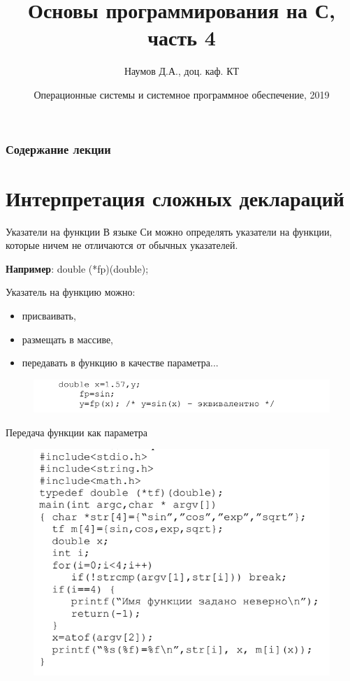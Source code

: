 \documentclass{beamer}
\title[Язык C]{Основы программирования на С, часть 4}
\author{Наумов Д.А., доц. каф. КТ}
\date[12.09.2019] {Операционные системы и системное программное обеспечение, 2019}
\begin{document}
\begin{frame}
  \titlepage
\end{frame}
  
\begin{frame}
  \frametitle{Содержание лекции}
  \tableofcontents  
\end{frame}

\section{Интерпретация сложных деклараций}
\begin{frame}{Указатели на функции}
В языке Си можно определять указатели на функции, которые
ничем не отличаются от обычных указателей. 

\textbf{Например}: double (*fp)(double);

Указатель на функцию можно:
\begin{itemize}
\item присваивать, 
\item размещать в массиве, 
\item передавать в функцию в качестве параметра...
\end{itemize}
\begin{figure}[h]
\centering
\includegraphics[scale=0.6]{images/lec04-pic01.png}
\end{figure}
\end{frame}

\begin{frame}{Передача функции как параметра}
\begin{figure}[h]
\centering
\includegraphics[scale=0.5]{images/lec04-pic02.png}
\end{figure}
\end{frame}
\end{document}
